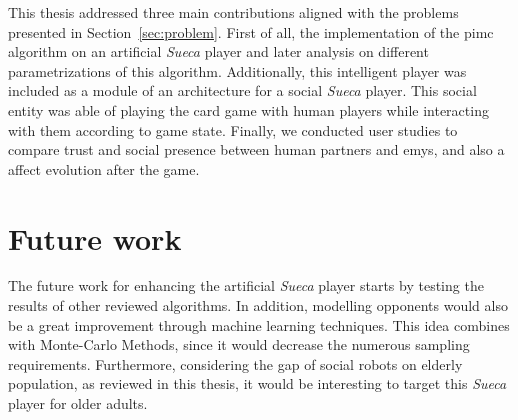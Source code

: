 \label{chapter:conclusion}

This thesis addressed three main contributions aligned with the problems presented in Section~\ref{sec:problem}.
First of all, the implementation of the \ac{pimc} algorithm on an artificial \emph{Sueca} player and later analysis on different parametrizations of this algorithm.
Additionally, this intelligent player was included as a module of an architecture for a social \emph{Sueca} player.
This social entity was able of playing the card game with human players while interacting with them according to game state.
Finally, we conducted user studies to compare trust and social presence between human partners and \ac{emys}, and also a affect evolution after the game.

\section{Future work}
The future work for enhancing the artificial \emph{Sueca} player starts by testing the results of other reviewed algorithms.
In addition, modelling opponents would also be a great improvement through machine learning techniques.
This idea combines with Monte-Carlo Methods, since it would decrease the numerous sampling requirements.
Furthermore, considering the gap of social robots on elderly population, as reviewed in this thesis, it would be interesting to target this \emph{Sueca} player for older adults.